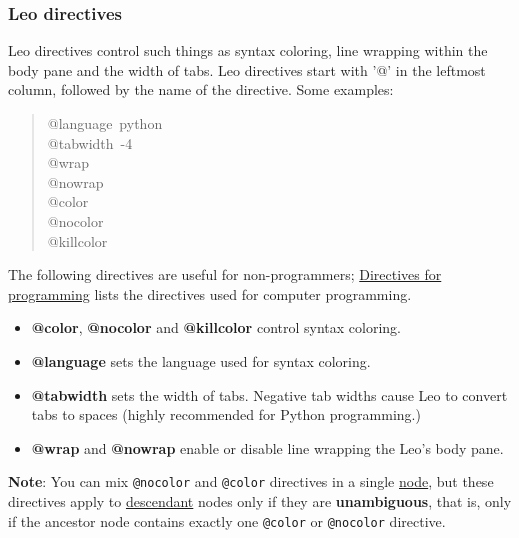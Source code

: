\documentclass[10pt,a4paper,english]{article}
\begin{document}
\subsubsection*{Leo directives}

Leo directives control such things as syntax coloring, line wrapping within the body pane and the width of tabs.
Leo directives start with '@' in the leftmost column, followed by the name of the directive.  Some examples:
\begin{quote}{\ttfamily \raggedright \noindent
@language~python~\\
@tabwidth~-4~\\
@wrap~\\
@nowrap~\\
@color~\\
@nocolor~\\
@killcolor
}\end{quote}

The following directives are useful for non-programmers;
\href{\#directives-for-programming}{Directives for programming} lists the directives used for computer programming.
\begin{itemize}
\item {} 
\textbf{@color}, \textbf{@nocolor} and \textbf{@killcolor} control syntax coloring.

\item {} 
\textbf{@language} sets the language used for syntax coloring.

\item {} 
\textbf{@tabwidth} sets the width of tabs.
Negative tab widths cause Leo to convert tabs to spaces
(highly recommended for Python programming.)

\item {} 
\textbf{@wrap} and \textbf{@nowrap} enable or disable line wrapping the Leo's body pane.

\end{itemize}

\textbf{Note}:
You can mix \texttt{@nocolor} and \texttt{@color} directives in a single \href{glossary.html\#node}{node},
but these directives apply to \href{glossary.html\#descendant}{descendant} nodes only if they are \textbf{unambiguous}, that is,
only if the ancestor node contains exactly one \texttt{@color} or \texttt{@nocolor} directive.



\hypertarget{leo-for-programmers}{}
\end{document}
